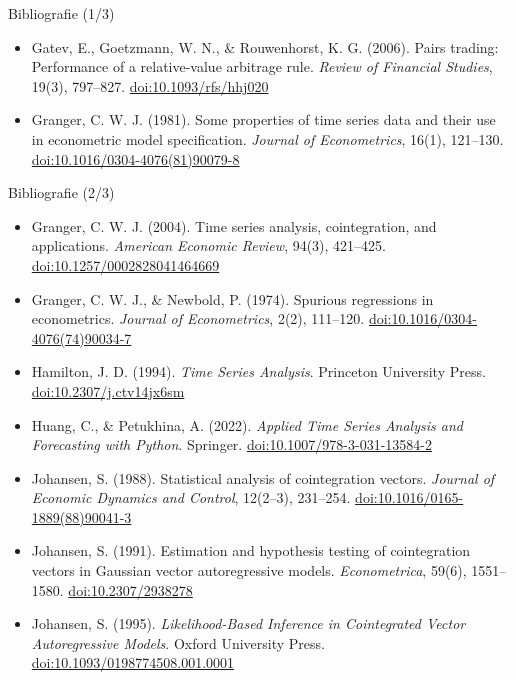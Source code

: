 \begin{frame}{Bibliografie (1/3)}
\begin{itemize}
    \item Gatev, E., Goetzmann, W. N., \& Rouwenhorst, K. G. (2006). Pairs trading: Performance of a relative-value arbitrage rule. \textit{Review of Financial Studies}, 19(3), 797--827. \href{https://doi.org/10.1093/rfs/hhj020}{doi:10.1093/rfs/hhj020}
    \item Granger, C. W. J. (1981). Some properties of time series data and their use in econometric model specification. \textit{Journal of Econometrics}, 16(1), 121--130. \href{https://doi.org/10.1016/0304-4076(81)90079-8}{doi:10.1016/0304-4076(81)90079-8}
\end{itemize}
\end{frame}

\begin{frame}{Bibliografie (2/3)}
\itemsize{\scriptsize}
\begin{itemize}
    \item Granger, C. W. J. (2004). Time series analysis, cointegration, and applications. \textit{American Economic Review}, 94(3), 421--425. \href{https://doi.org/10.1257/0002828041464669}{doi:10.1257/0002828041464669}
    \item Granger, C. W. J., \& Newbold, P. (1974). Spurious regressions in econometrics. \textit{Journal of Econometrics}, 2(2), 111--120. \href{https://doi.org/10.1016/0304-4076(74)90034-7}{doi:10.1016/0304-4076(74)90034-7}
    \item Hamilton, J. D. (1994). \textit{Time Series Analysis}. Princeton University Press. \href{https://doi.org/10.2307/j.ctv14jx6sm}{doi:10.2307/j.ctv14jx6sm}
    \item Huang, C., \& Petukhina, A. (2022). \textit{Applied Time Series Analysis and Forecasting with Python}. Springer. \href{https://doi.org/10.1007/978-3-031-13584-2}{doi:10.1007/978-3-031-13584-2}
    \item Johansen, S. (1988). Statistical analysis of cointegration vectors. \textit{Journal of Economic Dynamics and Control}, 12(2--3), 231--254. \href{https://doi.org/10.1016/0165-1889(88)90041-3}{doi:10.1016/0165-1889(88)90041-3}
    \item Johansen, S. (1991). Estimation and hypothesis testing of cointegration vectors in Gaussian vector autoregressive models. \textit{Econometrica}, 59(6), 1551--1580. \href{https://doi.org/10.2307/2938278}{doi:10.2307/2938278}
    \item Johansen, S. (1995). \textit{Likelihood-Based Inference in Cointegrated Vector Autoregressive Models}. Oxford University Press. \href{https://doi.org/10.1093/0198774508.001.0001}{doi:10.1093/0198774508.001.0001}

\end{itemize}
\end{frame}
